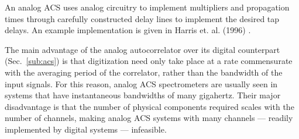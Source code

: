 \documentclass{ws-rv961x669}
\begin{document}


An analog ACS uses analog circuitry to implement multipliers and propagation times through carefully constructed delay lines to implement the desired tap delays. 
An example implementation is given in Harris et. al. (1996) \cite{Harris1998}.

The main advantage of the analog autocorrelator over its digital counterpart (Sec.~\ref{sub:acs}) is that digitization need only take place at a rate commensurate with the averaging period of the correlator, rather than the bandwidth of the input signals. For this reason, analog ACS spectrometers are usually seen in systems that have instantaneous bandwidths of many gigahertz. Their major disadvantage is that the number of physical components required scales with the number of channels, making analog ACS systems with many channels --- readily implemented by digital systems ---  infeasible.



\end{document}
